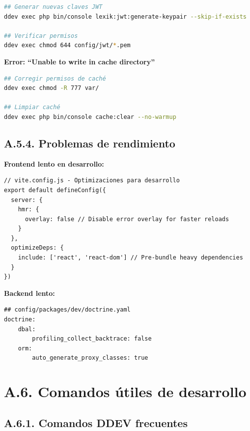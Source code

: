 \documentclass[12pt,a4paper,oneside]{report}
\begin{document}
\begin{lstlisting}[language=bash]
## Generar nuevas claves JWT
ddev exec php bin/console lexik:jwt:generate-keypair --skip-if-exists

## Verificar permisos
ddev exec chmod 644 config/jwt/*.pem
\end{lstlisting}

\textbf{Error: ``Unable to write in cache directory''}

\begin{lstlisting}[language=bash]
## Corregir permisos de caché
ddev exec chmod -R 777 var/

## Limpiar caché
ddev exec php bin/console cache:clear --no-warmup
\end{lstlisting}

\subsection{A.5.4. Problemas de
rendimiento}\label{a.5.4.-problemas-de-rendimiento}

\textbf{Frontend lento en desarrollo:}

\begin{lstlisting}
// vite.config.js - Optimizaciones para desarrollo
export default defineConfig({
  server: {
    hmr: {
      overlay: false // Disable error overlay for faster reloads
    }
  },
  optimizeDeps: {
    include: ['react', 'react-dom'] // Pre-bundle heavy dependencies
  }
})
\end{lstlisting}

\textbf{Backend lento:}

\begin{lstlisting}
## config/packages/dev/doctrine.yaml
doctrine:
    dbal:
        profiling_collect_backtrace: false
    orm:
        auto_generate_proxy_classes: true
\end{lstlisting}

\section{A.6. Comandos útiles de
desarrollo}\label{a.6.-comandos-uxfatiles-de-desarrollo}

\subsection{A.6.1. Comandos DDEV
frecuentes}\label{a.6.1.-comandos-ddev-frecuentes}
\end{document}
